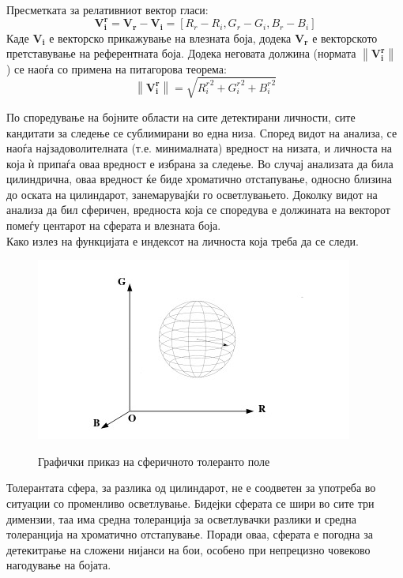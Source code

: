 \documentclass[12pt]{article}
\newcommand\norm[1]{\left\lVert#1\right\rVert}
\renewcommand{\vec}[1]{\mathbf{#1}}
\begin{document}
        Пресметката за релативниот вектор гласи:
        $$ \vec{V_i^r} = \vec{V_r} - \vec{V_i}= [R_r - R_i, G_r - G_i, B_r - B_i] $$
        Каде $\vec{V_i}$ е векторско прикажување на влезната боја, додека $\vec{V_r}$ е векторското претставување на референтната боја.
        Додека неговата должина (нормата $\norm{\vec{V_i^r}}$ ) се наоѓа со примена на питагорова теорема:
        $$ \norm{\vec{V_i^r}} = \sqrt{{R_i^r}^2 + {G_i^r}^2 + {B_i^r}^2} $$

        По споредување на бојните области на сите детектирани личности, сите кандитати за следење се сублимирани во една низа. Според видот на анализа, се наоѓа најзадоволителната (т.е. минималната) вредност на низата, и личноста на која ѝ припаѓа оваа вредност е избрана за следење. Во случај анализата да била цилиндрична, оваа вредност ќе биде хроматично отстапување, односно близина до оската на цилиндарот, занемарувајќи го осветлувањето. Доколку видот на анализа да бил сферичен, вредноста која се споредува е должината на векторот помеѓу центарот на сферата и влезната боја.
        \\
        Како излез на функцијата е индексот на личноста која треба да се следи.

        \begin{figure}[H]
          \centering
          \includegraphics[width = 0.45\linewidth]{./images/sphere.png}
          \label{fig:sphere}
          \caption{Графички приказ на сферичното толеранто поле}
        \end{figure}
        Толерантата сфера, за разлика од цилиндарот, не е соодветен за употреба во ситуации со променливо осветлување. Бидејки сферата се шири во сите три димензии, таа има средна толеранција за осветлувачки разлики и средна толеранција на хроматично отстапување. Поради оваа, сферата е погодна за детекитрање на сложени нијанси на бои, особено при непрецизно човеково нагодување на бојата.
\end{document}
